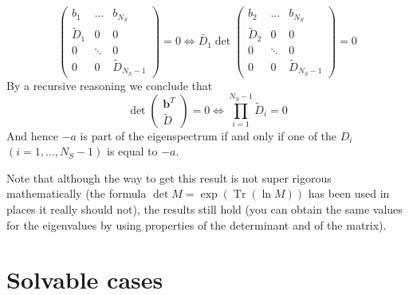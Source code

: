 \documentclass[12pt]{article}
\DeclareMathOperator{\Tr}{Tr}
\newcommand{\vect}[1]{\textbf{#1}}
\begin{document}
\begin{appendices}
\begin{equation}
\begin{pmatrix}
			b_1 & \dots & b_{N_S} \\
			\tilde{D}_1 & 0 & 0 \\
			0 & \ddots & 0 \\
			0 & 0 & \tilde{D}_{N_S-1}
		\end{pmatrix} = 0 \iff \tilde{D_1} \det
		\begin{pmatrix}
			b_2 & \dots & b_{N_S} \\
			\tilde{D}_2 &  0 & 0 \\
			0 & \ddots & 0 \\
			0 & 0 & \tilde{D}_{N_S-1} 
		\end{pmatrix} = 0
	\end{equation}
	By a recursive reasoning we conclude that 
	\begin{equation}
		\det
		\begin{pmatrix}
			\vect{b}^T \\
			\tilde{D}
		\end{pmatrix}
		= 0 \iff \prod_{i=1}^{N_S-1} \tilde{D}_i =0
	\end{equation}
	And hence $-a$ is part of the eigenspectrum if and only if one of the $D_i$ $(i=1, \dots, N_S-1)$ is equal to $-a$.

	Note that although the way to get this result is not super rigorous mathematically (the formula $\det M = \exp\left(\Tr\left(\ln M\right)\right)$ has been used in places it really should not), the results still hold (you can obtain the same values for the eigenvalues by using properties of the determinant and of the matrix).

	\clearpage
	\section{Solvable cases}

\end{appendices}
\end{document}

